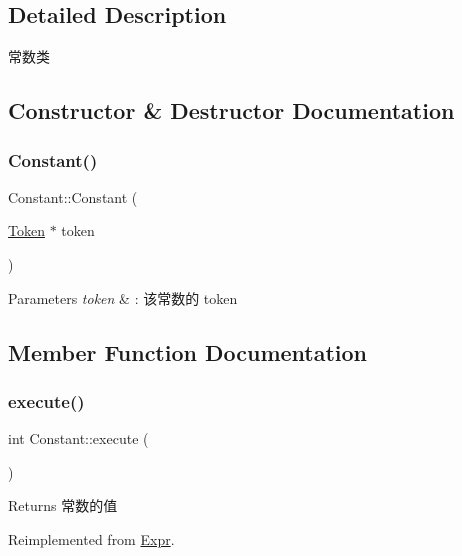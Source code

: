 \subsection{Detailed Description}
常数类 

\subsection{Constructor \& Destructor Documentation}
\mbox{\label{class_constant_ad227bb35513aab43d86572343a1fe564}} 
\subsubsection{\texorpdfstring{Constant()}{Constant()}}
{\footnotesize\ttfamily Constant\+::\+Constant (\begin{DoxyParamCaption}\item[{\hyperlink{class_token}{Token} $\ast$}]{token }\end{DoxyParamCaption})}


\begin{DoxyParams}{Parameters}
{\em token} & \+: 该常数的 token \\
\hline
\end{DoxyParams}


\subsection{Member Function Documentation}
\mbox{\label{class_constant_ab5c55607bcff5ce70131a588b6bdbed7}} 
\subsubsection{\texorpdfstring{execute()}{execute()}}
{\footnotesize\ttfamily int Constant\+::execute (\begin{DoxyParamCaption}{ }\end{DoxyParamCaption})\hspace{0.3cm}{\ttfamily [virtual]}}

\begin{DoxyReturn}{Returns}
常数的值 
\end{DoxyReturn}


Reimplemented from \hyperlink{class_expr_aff6a2e6eaa460e2a3db28ebdab089b51}{Expr}.



